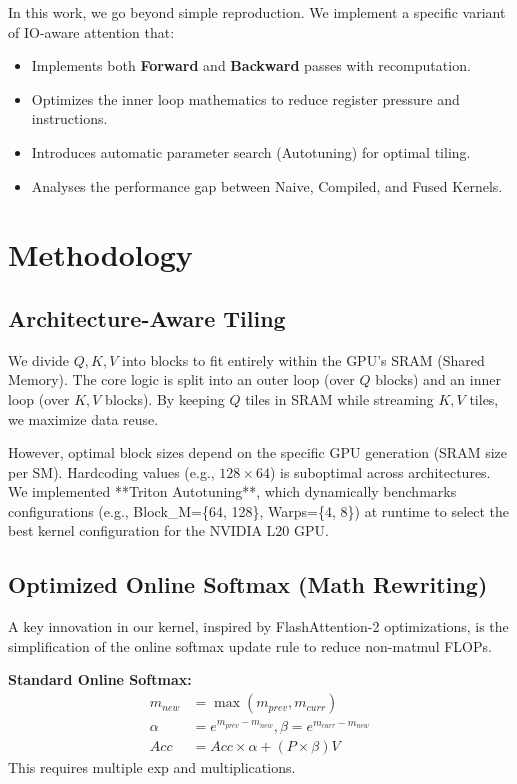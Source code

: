 \documentclass[10pt,conference,letterpaper]{IEEEtran}
\begin{document}
In this work, we go beyond simple reproduction. We implement a specific variant of IO-aware attention that:
\begin{itemize}
    \item Implements both \textbf{Forward} and \textbf{Backward} passes with recomputation.
    \item Optimizes the inner loop mathematics to reduce register pressure and instructions.
    \item Introduces automatic parameter search (Autotuning) for optimal tiling.
    \item Analyses the performance gap between Naive, Compiled, and Fused Kernels.
\end{itemize}

\section{Methodology}

\subsection{Architecture-Aware Tiling}
We divide $Q, K, V$ into blocks to fit entirely within the GPU's SRAM (Shared Memory). The core logic is split into an outer loop (over $Q$ blocks) and an inner loop (over $K, V$ blocks). By keeping $Q$ tiles in SRAM while streaming $K, V$ tiles, we maximize data reuse.

However, optimal block sizes depend on the specific GPU generation (SRAM size per SM). Hardcoding values (e.g., $128 \times 64$) is suboptimal across architectures. We implemented **Triton Autotuning**, which dynamically benchmarks configurations (e.g., Block\_M=\{64, 128\}, Warps=\{4, 8\}) at runtime to select the best kernel configuration for the NVIDIA L20 GPU.

\subsection{Optimized Online Softmax (Math Rewriting)}
A key innovation in our kernel, inspired by FlashAttention-2 optimizations, is the simplification of the online softmax update rule to reduce non-matmul FLOPs.

\textbf{Standard Online Softmax:}
\begin{equation}
\begin{aligned}
m_{new} &= \max(m_{prev}, m_{curr}) \\
\alpha &= e^{m_{prev} - m_{new}}, \beta = e^{m_{curr} - m_{new}} \\
Acc &= Acc \times \alpha + (P \times \beta) V
\end{aligned}
\end{equation}
This requires multiple exp and multiplications.
\end{document}
